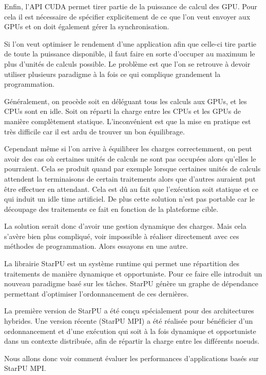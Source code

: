 \documentclass[smallextended]{svjour3}
\begin{document}
Enfin, l'API CUDA permet tirer partie de la puissance de calcul
des GPU. Pour cela il est nécessaire de spécifier explicitement de
ce que l'on veut envoyer aux GPUs et on doit également gérer la
synchronisation.  

Si l'on veut optimiser le rendement d'une application afin que
celle-ci tire partie de toute la puissance disponible, il faut faire
en sorte d'occuper au maximum le plus d'unités de calculs possible.  
Le problème est que l'on se retrouve à devoir utiliser plusieurs
paradigme à la fois ce qui complique grandement la programmation.

Généralement, on procède soit en déléguant tous les calculs aux
GPUs, et les CPUs sont en idle. Soit on réparti la charge entre les
CPUs et les GPUs de manière complètement
statique\cite{StarPU-MPI}. L'inconvénient est que la mise en
pratique est très difficile car il est ardu de trouver un bon
équilibrage. 

Cependant même si l'on arrive à équilibrer les charges
correctemment, on peut avoir des cas où certaines unités de
calculs ne sont pas occupées alors qu'elles le pourraient. Cela se
produit quand par exemple lorsque certaines unités de calculs
attendent la terminaisons de certain traitements alors que
d'autres auraient put être effectuer en attendant. Cela est dû au
fait que l'exécution soit statique et ce qui induit un idle time
artificiel. De plus cette solution n'est pas portable car le
découpage des traitements ce fait en fonction de la plateforme
cible.

La solution serait donc d'avoir une gestion dynamique des
charges. Mais cela s'avère bien plus compliqué, voir impossible
à réaliser directement avec ces méthodes de programmation. Alors
essayons en une autre.

La librairie StarPU\cite{StarPU} est un système runtime qui permet
une répartition des traitements de manière dynamique et
opportuniste. Pour ce faire elle introduit un nouveau paradigme basé
sur les tâches. StarPU génère un graphe de dépendance permettant
d'optimiser l'ordonnancement de ces dernières. 

La première version de StarPU a été conçu spécialement pour des
architectures hybrides. Une version récente (StarPU MPI)\cite{StarPU-MPI} a été
réalisée pour bénéficier d'un ordonnancement et d'une exécution qui
soit à la fois dynamique et opportuniste dans un contexte distribuée,
afin de répartir la charge entre les différents noeuds.

Nous allons donc voir comment évaluer les performances
d'applications basés sur StarPU MPI.
\end{document}
